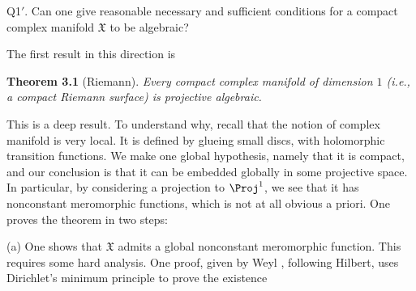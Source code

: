 {\smallskip
\hypertarget{question-B-Q1prime}{}Q1$'$. Can one give reasonable necessary and sufficient conditions for a compact complex manifold $\mathfrak X$ to be algebraic?

\smallskip
The first result in this direction is

\medskip
\noindent\hypertarget{result-B-3.1}{}\textbf{Theorem 3.1} (Riemann). \emph{Every compact complex manifold of dimension $1$ (i.e., a compact Riemann surface) is projective algebraic.}

\medskip
This is a deep result. To understand why, recall that the notion of complex manifold is very local. It is defined by glueing small discs, with holomorphic transition functions. We make one global hypothesis, namely that it is compact, and our conclusion is that it can be embedded globally in some projective space. In particular, by considering a projection to $\Proj^1$, we see that it has nonconstant meromorphic functions, which is not at all obvious a priori. One proves the theorem in two steps:

\hypertarget{result-B-3.1a}{}(a) One shows that $\mathfrak X$ admits a global nonconstant meromorphic function. This requires some hard analysis. One proof, given by Weyl , following Hilbert, uses Dirichlet's minimum principle to prove the existence
}
